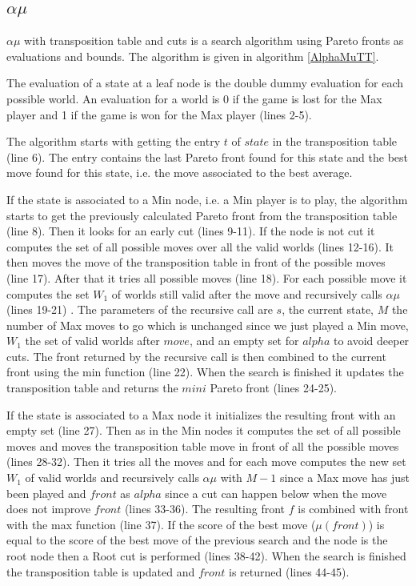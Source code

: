 \documentclass{ecai}
\begin{document}
\subsection{$\alpha\mu$}


$\alpha\mu$ with transposition table and cuts is a search algorithm
using Pareto fronts as evaluations and bounds. The algorithm is given
in algorithm \ref{AlphaMuTT}.

The evaluation of a state at a leaf node is the double dummy
evaluation for each possible world. An evaluation for a world is 0 if
the game is lost for the Max player and 1 if the game is won for the
Max player (lines 2-5).

The algorithm starts with getting the entry $t$ of $state$ in the
transposition table (line 6). The entry contains the last Pareto front
found for this state and the best move found for this state, i.e. the
move associated to the best average.

If the state is associated to a Min node, i.e. a Min player is to
play, the algorithm starts to get the previously calculated Pareto
front from the transposition table (line 8). Then it looks for an
early cut (lines 9-11). If the node is not cut it computes the set of
all possible moves over all the valid worlds (lines 12-16). It then
moves the move of the transposition table in front of the possible
moves (line 17). After that it tries all possible moves (line 18). For
each possible move it computes the set $W_1$ of worlds still valid
after the move and recursively calls $\alpha\mu$ (lines 19-21) . The
parameters of the recursive call are $s$, the current state, $M$ the
number of Max moves to go which is unchanged since we just played a
Min move, $W_1$ the set of valid worlds after $move$, and an empty set
for $alpha$ to avoid deeper cuts. The front returned by the recursive
call is then combined to the current front using the min function
(line 22). When the search is finished it updates the transposition
table and returns the $mini$ Pareto front (lines 24-25).

If the state is associated to a Max node it initializes the resulting
front with an empty set (line 27). Then as in the Min nodes it
computes the set of all possible moves and moves the transposition
table move in front of all the possible moves (lines 28-32). Then it
tries all the moves and for each move computes the new set $W_1$ of
valid worlds and recursively calls $\alpha\mu$ with $M-1$ since a Max
move has just been played and $front$ as $alpha$ since a cut can
happen below when the move does not improve $front$ (lines 33-36). The
resulting front $f$ is combined with front with the max function (line
37). If the score of the best move ($\mu(front)$) is equal to the
score of the best move of the previous search and the node is the root
node then a Root cut is performed (lines 38-42). When the search is
finished the transposition table is updated and $front$ is returned
(lines 44-45).
\end{document}
